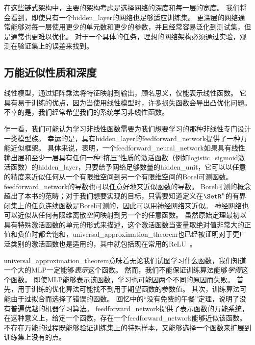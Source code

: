 在这些链式架构中，主要的架构考虑是选择网络的深度和每一层的宽度。
我们将会看到，即使只有一个\gls{hidden_layer}的网络也足够适应训练集。
更深层的网络通常能够对每一层使用更少的单元数和更少的参数，并且经常容易泛化到测试集，但是通常也更难以优化。
对于一个具体的任务，理想的网络架构必须通过实验，观测在验证集上的误差来找到。

\subsection{万能近似性质和深度}
\label{sec:universal_approximation_properties_and_depth}

线性模型，通过矩阵乘法将特征映射到输出，顾名思义，仅能表示线性函数。
它具有易于训练的优点，因为当使用线性模型时，许多损失函数会导出凸优化问题。
不幸的是，我们经常希望我们的系统学习非线性函数。

乍一看，我们可能认为学习非线性函数需要为我们想要学习的那种非线性专门设计一类模型族。
幸运的是，具有\gls{hidden_layer}的\gls{feedforward_network}提供了一种万能近似框架。
具体来说，\citep{Hornik-et-al-1989,Cybenko-1989}表明，一个\gls{feedforward_neural_network}如果具有线性输出层和至少一层具有任何一种``挤压''性质的激活函数（例如\gls{logistic_sigmoid}激活函数）的\gls{hidden_layer}，只要给予网络足够数量的\gls{hidden_unit}，它可以以任意的精度来近似任何从一个有限维空间到另一个有限维空间的Borel可测函数。
\gls{feedforward_network}的导数也可以任意好地来近似函数的导数\citep{Hornik-et-al-1990}。
Borel可测的概念超出了本书的范畴；对于我们想要实现的目标，只需要知道定义在$\SetR^n$的有界闭集上的任意连续函数是Borel可测的，因此可以用神经网络来近似。
神经网络也可以近似从任何有限维离散空间映射到另一个的任意函数。
虽然原始定理最初以具有特殊激活函数的单元的形式来描述，这个激活函数当变量取绝对值非常大的正值和负值时都会饱和，\gls{universal_approximation_theorem}也已经被证明对于更广泛类别的激活函数也是适用的，其中就包括现在常用的\gls{ReLU}~\citep{Leshno-et-al-1993}。


\gls{universal_approximation_theorem}意味着无论我们试图学习什么函数，我们知道一个大的MLP一定能够\emph{表示}这个函数。
然而，我们不能保证训练算法能够\emph{学得}这个函数。
即使MLP能够表示该函数，学习也可能因两个不同的原因而失败。
首先，用于训练的优化算法可能找不到用于期望函数的参数值。
其次，训练算法可能由于过拟合而选择了错误的函数。
回忆中的``没有免费的午餐''定理，说明了没有普遍优越的机器学习算法。
\gls{feedforward_network}提供了表示函数的万能系统，在这种意义上，给定一个函数，存在一个\gls{feedforward_network}能够近似该函数。
不存在万能的过程既能够验证训练集上的特殊样本，又能够选择一个函数来扩展到训练集上没有的点。


